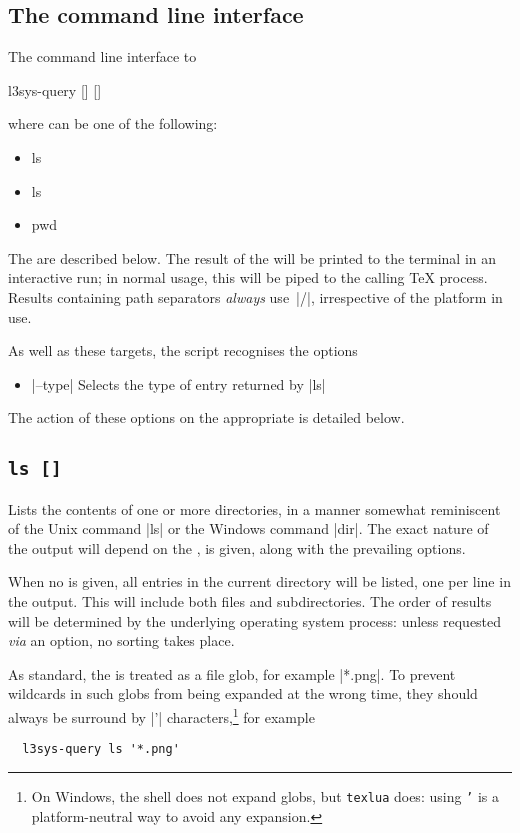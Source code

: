 \documentclass{l3doc}
\begin{document}
\begin{documentation}
\section{The command line interface}

The command line interface to 
\begin{center}
  \ttfamily
  l3sys-query  [] []
\end{center}
where \texttt{} can be one of the following:
\begin{itemize}[noitemsep]\ttfamily
  \item ls
  \item ls 
  \item pwd
\end{itemize}
The  are described below. The result of the  will be
printed to the terminal in an interactive run; in normal usage, this will be
piped to the calling \TeX{} process. Results containing path separators
\emph{always} use~|/|, irrespective of the platform in use.

As well as these targets, the script recognises the options
\begin{itemize}
  \item |--type| Selects the type of entry returned by |ls|
\end{itemize}
The action of these options on the appropriate  is detailed below.

\subsection{\texttt{ls []}}

Lists the contents of one or more directories, in a manner somewhat reminiscent
of the Unix command |ls| or the Windows command |dir|. The exact nature of the
output will depend on the , is given, along with the prevailing
options.

When no  is given, all entries in the current directory will be
listed, one per line in the output. This will include both files and
subdirectories. The order of results will be determined by the underlying
operating system process: unless requested \emph{via} an option, no sorting
takes place.

As standard, the  is treated as a file glob, for example |*.png|. To
prevent wildcards in such globs from being expanded at the wrong time, they
should always be surround by |'| characters,\footnote{On Windows, the shell does
not expand globs, but \texttt{texlua} does: using \texttt{'} is a
platform-neutral way to avoid any expansion.} for example
\begin{verbatim}
  l3sys-query ls '*.png'
\end{verbatim}


\end{documentation}
\end{document}
